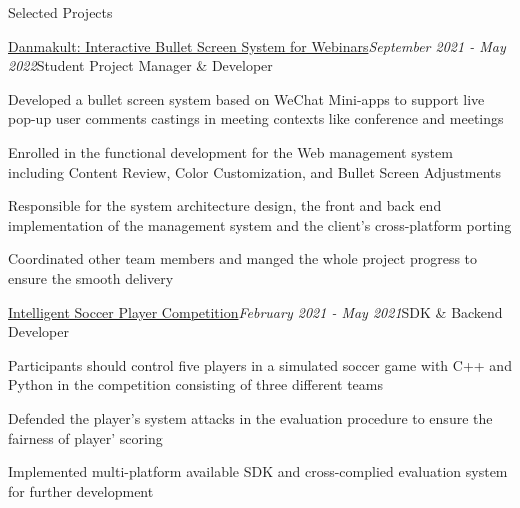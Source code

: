 \documentclass{resume} %
\newcommand{\Feb}{February }
\newcommand{\May}{May }
\newcommand{\Sept}{September }
\begin{document}
\begin{rSection}{Selected Projects}
  
\begin{rSubsection}{\href{https://github.com/panda2134/DanmakuIt}{Danmakult: Interactive Bullet Screen System for Webinars}}{\em \Sept 2021 - \May 2022}{Student Project Manager \& Developer}{}
    
\item Developed a bullet screen system based on WeChat Mini-apps to support live pop-up user comments castings in meeting contexts like conference and meetings
\item Enrolled in the functional development for the Web management system including Content Review, Color Customization, and Bullet Screen Adjustments
\item Responsible for the system architecture design, the front and back end implementation of the management system and the client's cross-platform porting
\item Coordinated other team members and manged the whole project progress to ensure the smooth delivery

\end{rSubsection}

\begin{rSubsection}{\href{https://github.com/ssast-tech/thuai-egg-2021-backend}{Intelligent Soccer Player Competition}}{\em \Feb 2021 - \May 2021}{SDK \& Backend Developer}{}
    
\item Participants should control five players in a simulated soccer game with C++ and Python in the competition consisting of three different teams
\item Defended the player's system attacks in the evaluation procedure to ensure the fairness of player' scoring
\item Implemented multi-platform available SDK and cross-complied evaluation system for further development


\end{rSubsection}

\end{rSection}
\end{document}
